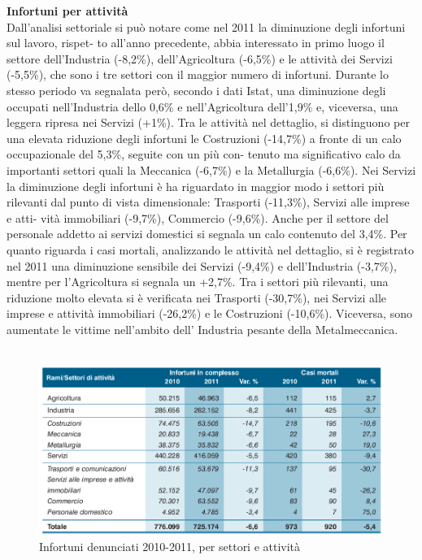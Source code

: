 \textbf{Infortuni per attività}\\
Dall’analisi settoriale si può notare come nel 2011 la diminuzione degli infortuni sul lavoro, rispet-
to all’anno precedente, abbia interessato in primo luogo il settore dell’Industria (-8,2\%), dell’Agricoltura (-6,5\%) e le attività dei Servizi (-5,5\%), che sono i tre settori con il maggior numero di infortuni.
Durante lo stesso periodo va segnalata però, secondo i dati Istat, una diminuzione degli occupati nell’Industria dello 0,6\% e nell’Agricoltura dell’1,9\% e, viceversa, una leggera ripresa nei Servizi (+1\%).
Tra le attività nel dettaglio, si distinguono per una elevata riduzione degli infortuni le
Costruzioni (-14,7\%) a fronte di un calo occupazionale del 5,3\%, seguite con un più con-
tenuto ma significativo calo da importanti settori quali la Meccanica (-6,7\%) e la
Metallurgia (-6,6\%).
Nei Servizi la diminuzione degli infortuni è ha riguardato in maggior modo i settori
più rilevanti dal punto di vista dimensionale: Trasporti (-11,3\%), Servizi alle imprese e atti-
vità immobiliari (-9,7\%), Commercio (-9,6\%). Anche per il settore del personale addetto
ai servizi domestici si segnala un calo contenuto del 3,4\%.
Per quanto riguarda i casi mortali, analizzando le attività nel dettaglio, si è registrato nel
2011 una diminuzione sensibile dei Servizi (-9,4\%) e dell’Industria (-3,7\%), mentre per
l’Agricoltura si segnala un +2,7\%. Tra i settori più rilevanti, una riduzione molto elevata
si è verificata nei Trasporti (-30,7\%), nei Servizi alle imprese e attività immobiliari (-26,2\%)
e le Costruzioni (-10,6\%). Viceversa, sono aumentate le vittime nell'ambito dell’ Industria pesante della Metalmeccanica.\\\\


\begin{figure}[H]
\centering
\includegraphics[scale=0.5]{images/cap4/analisiDiMercato/infortuniPerGestione2}
\caption{Infortuni denunciati 2010-2011, per settori e attività}
\end{figure}









